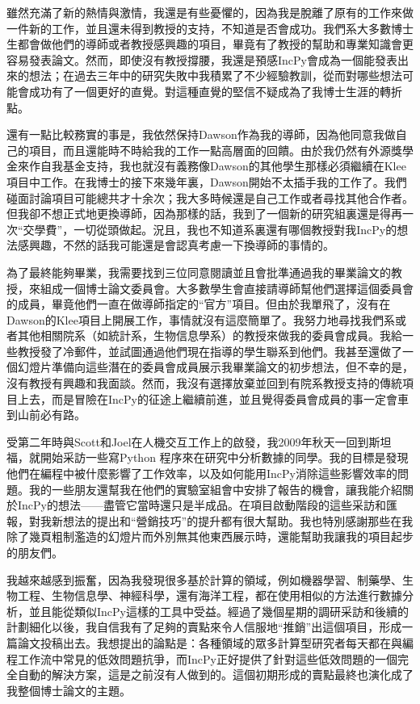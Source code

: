 \documentclass[12pt,UTF8,nofonts]{book}
\begin{document}
雖然充滿了新的熱情與激情，我還是有些憂懼的，因為我是脫離了原有的工作來做一件新的工作，並且還未得到教授的支持，不知道是否會成功。我們系大多數博士生都會做他們的導師或者教授感興趣的項目，畢竟有了教授的幫助和專業知識會更容易發表論文。然而，即使沒有教授撐腰，我還是預感IncPy會成為一個能發表出來的想法；在過去三年中的研究失敗中我積累了不少經驗教訓，從而對哪些想法可能會成功有了一個更好的直覺。對這種直覺的堅信不疑成為了我博士生涯的轉折點。

還有一點比較務實的事是，我依然保持Dawson作為我的導師，因為他同意我做自己的項目，而且還能時不時給我的工作一點高層面的回饋。由於我仍然有外源獎學金來作自我基金支持，我也就沒有義務像Dawson的其他學生那樣必須繼續在Klee項目中工作。在我博士的接下來幾年裏，Dawson開始不太插手我的工作了。我們碰面討論項目可能總共才十余次；我大多時候還是自己工作或者尋找其他合作者。但我卻不想正式地更換導師，因為那樣的話，我到了一個新的研究組裏還是得再一次“交學費”，一切從頭做起。況且，我也不知道系裏還有哪個教授對我IncPy的想法感興趣，不然的話我可能還是會認真考慮一下換導師的事情的。

為了最終能夠畢業，我需要找到三位同意閱讀並且會批準通過我的畢業論文的教授，來組成一個博士論文委員會。大多數學生會直接請導師幫他們選擇這個委員會的成員，畢竟他們一直在做導師指定的“官方”項目。但由於我單飛了，沒有在Dawson的Klee項目上開展工作，事情就沒有這麼簡單了。我努力地尋找我們系或者其他相關院系（如統計系，生物信息學系）的教授來做我的委員會成員。我給一些教授發了冷郵件，並試圖通過他們現在指導的學生聯系到他們。我甚至還做了一個幻燈片準備向這些潛在的委員會成員展示我畢業論文的初步想法，但不幸的是，沒有教授有興趣和我面談。然而，我沒有選擇放棄並回到有院系教授支持的傳統項目上去，而是冒險在IncPy的征途上繼續前進，並且覺得委員會成員的事一定會車到山前必有路。

\breakline

受第二年時與Scott和Joel在人機交互工作上的啟發，我2009年秋天一回到斯坦福，就開始采訪一些寫Python 程序來在研究中分析數據的同學。我的目標是發現他們在編程中被什麼影響了工作效率，以及如何能用IncPy消除這些影響效率的問題。我的一些朋友還幫我在他們的實驗室組會中安排了報告的機會，讓我能介紹關於IncPy的想法——盡管它當時還只是半成品。在項目啟動階段的這些采訪和匯報，對我新想法的提出和“營銷技巧”的提升都有很大幫助。我也特別感謝那些在我除了幾頁粗制濫造的幻燈片而外別無其他東西展示時，還能幫助我讓我的項目起步的朋友們。

我越來越感到振奮，因為我發現很多基於計算的領域，例如機器學習、制藥學、生物工程、生物信息學、神經科學，還有海洋工程，都在使用相似的方法進行數據分析，並且能從類似IncPy這樣的工具中受益。經過了幾個星期的調研采訪和後續的計劃細化以後，我自信我有了足夠的賣點來令人信服地“推銷”出這個項目，形成一篇論文投稿出去。我想提出的論點是：各種領域的眾多計算型研究者每天都在與編程工作流中常見的低效問題抗爭，而IncPy正好提供了針對這些低效問題的一個完全自動的解決方案，這是之前沒有人做到的。這個初期形成的賣點最終也演化成了我整個博士論文的主題。
\end{document}
